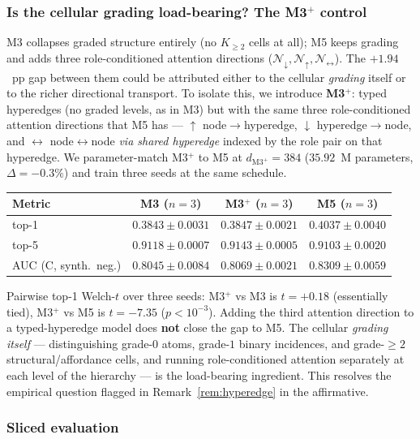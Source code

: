 \documentclass[11pt]{article}
\theoremstyle{definition}
\theoremstyle{plain}
\begin{document}
\subsubsection*{Is the cellular grading load-bearing? The M3$^{+}$ control}

M3 collapses graded structure entirely (no $K_{\ge 2}$ cells at all); M5
keeps grading and adds three role-conditioned attention directions
($\mathcal{N}_{\downarrow}, \mathcal{N}_{\uparrow}, \mathcal{N}_{\leftrightarrow}$).
The $+1.94$~pp gap between them could be attributed either to the cellular
\emph{grading} itself or to the richer directional transport. To isolate
this, we introduce \textbf{M3}$^{+}$: typed hyperedges (no graded levels,
as in M3) but with the same three role-conditioned attention directions
that M5 has — $\uparrow$ node$\to$hyperedge, $\downarrow$ hyperedge$\to$node,
and $\leftrightarrow$ node$\leftrightarrow$node \emph{via shared hyperedge}
indexed by the role pair on that hyperedge. We parameter-match M3$^{+}$ to
M5 at $d_{\mathrm{M3}^{+}} = 384$ ($35.92$~M parameters, $\Delta = -0.3\%$)
and train three seeds at the same schedule.

\begin{center}
\small
\begin{tabular}{lccc}
\toprule
Metric & M3 ($n{=}3$) & M3$^{+}$ ($n{=}3$) & M5 ($n{=}3$) \\
\midrule
top-1 & $0.3843 \pm 0.0031$ & $0.3847 \pm 0.0021$ & $0.4037 \pm 0.0040$ \\
top-5 & $0.9118 \pm 0.0007$ & $0.9143 \pm 0.0005$ & $0.9103 \pm 0.0020$ \\
AUC (C, synth.\ neg.) & $0.8045 \pm 0.0084$ & $0.8069 \pm 0.0021$ & $0.8309 \pm 0.0059$ \\
\bottomrule
\end{tabular}
\end{center}

\noindent Pairwise top-1 Welch-$t$ over three seeds: M3$^{+}$ vs M3 is
$t = +0.18$ (essentially tied), M3$^{+}$ vs M5 is $t = -7.35$ ($p < 10^{-3}$).
Adding the third attention direction to a typed-hyperedge model does
\textbf{not} close the gap to M5. The cellular \emph{grading itself} —
distinguishing grade-$0$ atoms, grade-$1$ binary incidences, and
grade-$\ge 2$ structural/affordance cells, and running role-conditioned
attention separately at each level of the hierarchy — is the load-bearing
ingredient. This resolves the empirical question flagged in
Remark~\ref{rem:hyperedge} in the affirmative.

\subsubsection*{Sliced evaluation}
\end{document}
